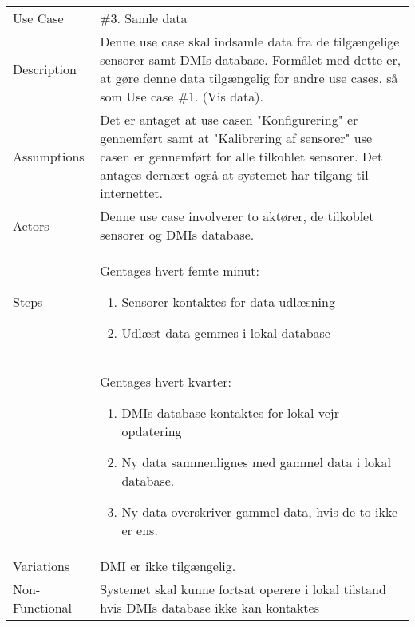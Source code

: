 \noindent
\begin{tabular}{@{}p{3.5cm}@{}p{13cm}@{}}
    Use Case & \#3. Samle data \\
    Description & 
    Denne use case skal indsamle data fra de tilgængelige sensorer samt DMIs database. Formålet med dette er, at gøre denne data tilgængelig for andre use cases, så som Use case \#1. (Vis data).\\
    Assumptions & 
    Det er antaget at use casen "Konfigurering" er gennemført samt at "Kalibrering af sensorer" use casen er gennemført for alle tilkoblet sensorer. Det antages dernæst også at systemet har tilgang til internettet.\\
    Actors & 
    Denne use case involverer to aktører, de tilkoblet sensorer og DMIs database.\\
    Steps & 
    Gentages hvert femte minut:
    \begin{enumerate}
        \item Sensorer kontaktes for data udlæsning
        \item Udlæst data gemmes i lokal database
    \end{enumerate}\\ &
    Gentages hvert kvarter:
    \begin{enumerate}
        \item DMIs database kontaktes for lokal vejr opdatering
        \item Ny data sammenlignes med gammel data i lokal database.
        \item Ny data overskriver gammel data, hvis de to ikke er ens.
    \end{enumerate}\\ 
    Variations & 
    DMI er ikke tilgængelig.\\
    Non-Functional & 
    Systemet skal kunne fortsat operere i lokal tilstand hvis DMIs database ikke kan kontaktes\\
\end{tabular}